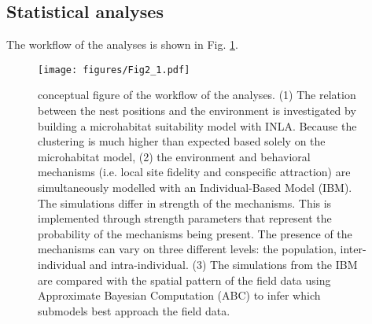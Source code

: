 \documentclass[10pt, twoside]{book} %
\begin{document}
	\subsection{Statistical analyses}
	The workflow of the analyses is shown in Fig. \ref{fig2.1}.\\
	\clearpage\hbox{}\vspace*{\fill}
	\begin{figure}[ht!]
		\begin{center}
			\texttt{[image: figures/Fig2\_1.pdf]}
		\end{center}
		\begin{footnotesize}
			\caption{conceptual figure of the workflow of the analyses. (1) The relation between the nest positions and the environment is investigated by building a microhabitat suitability model with INLA. Because the clustering is much higher than expected based solely on the microhabitat model, (2) the environment and behavioral mechanisms (i.e. local site fidelity and conspecific attraction) are simultaneously modelled with an Individual-Based Model (IBM). The simulations differ in strength of the mechanisms. This is implemented through strength parameters that represent the probability of the mechanisms being present. The presence of the mechanisms can vary on three different levels: the population, inter-individual and intra-individual. (3) The simulations from the IBM are compared with the spatial pattern of the field data using Approximate Bayesian Computation (ABC) to infer which submodels best approach the field data. \label{fig2.1}}
		\end{footnotesize}
	\end{figure}
\vspace*{\fill}
	\clearpage
\end{document}
